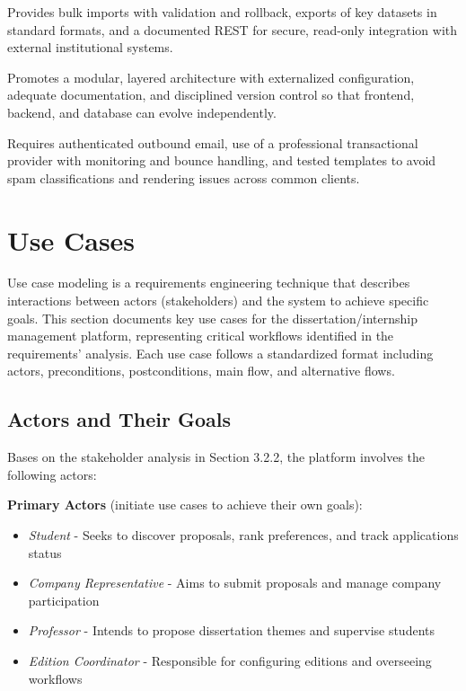 \begin{description}
{                }
            \item[NFR-INTER-x - Interoperability \& Data Exchange:] 
                {
                    Provides bulk imports with validation and rollback, exports of key datasets in standard formats, and a documented REST 
                     for secure, read-only integration with external institutional systems.
                }
            \item[NFR-MAINT-x - Maintainability \& Extensibility:] 
                {
                    Promotes a modular, layered architecture with externalized configuration, adequate documentation, and disciplined version control
                    so that frontend, backend, and database can evolve independently.
                }
            \item[NFR-EMAIL-x - Email Deliverability (Critical Legacy Fix):] 
                {
                    Requires authenticated outbound email, use of a professional transactional provider with monitoring and bounce handling,
                    and tested templates to avoid spam classifications and rendering issues across common clients.
                } 
        \end{description}

\section{Use Cases}
\label{sec:reqs_use_cases}
\ntindex[Template]{}
    {
        Use case modeling is a requirements engineering technique that describes interactions between actors (stakeholders) and the system to achieve specific goals.
        This section documents key use cases for the dissertation/internship management platform, representing critical workflows identified in the requirements' analysis. 
        Each use case follows a standardized format including actors, preconditions, postconditions, main flow, and alternative flows.
    }

    \subsection{Actors and Their Goals}
        {
            Bases on the stakeholder analysis in Section 3.2.2, the platform involves the following actors:
        }

        {
            \textbf{Primary Actors} (initiate use cases to achieve their own goals):
        }
        {
            \begin{itemize}
                \item {\textit{Student} - Seeks to discover proposals, rank preferences, and track applications status}
                \item {\textit{Company Representative} - Aims to submit proposals and manage company participation}
                \item {\textit{Professor} - Intends to propose dissertation themes and supervise students}
                \item {\textit{Edition Coordinator} - Responsible for configuring  editions and overseeing workflows}
            \end{itemize}
        }

